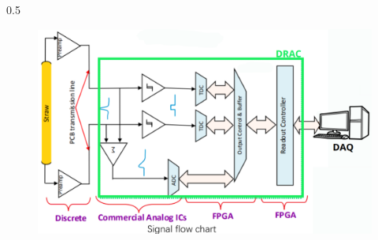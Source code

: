 \documentclass{beamer}
\begin{document}
\begin{frame}
\begin{columns}
\begin{column}{0.5\framewidth}
\begin{figure}[h]
          \label{fig:enter-label} 
      \end{figure} 
           \begin{figure}[h]
          \centering
          \vspace{-10mm}
            \includegraphics[width=1.02\columnwidth]{figures/png/Screenshot_20240529_133230.png}
          \label{fig:enter-label} 
      \end{figure} 
    \end{column}
    \end{columns}

\end{frame}
\end{document}
